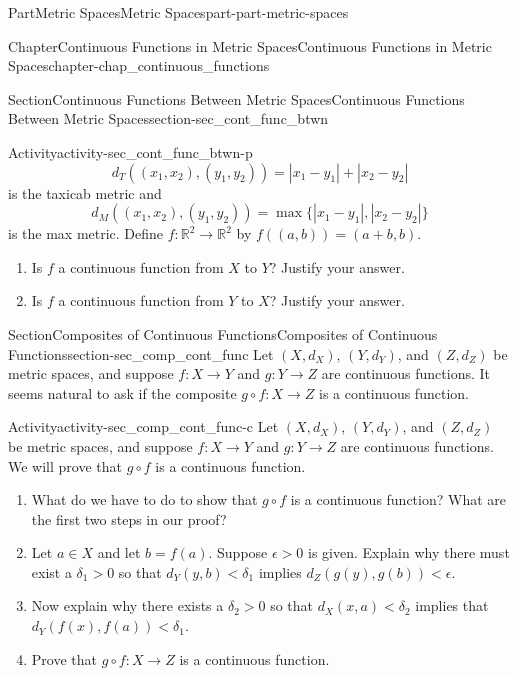 \documentclass[oneside,10pt,]{book}
\numberwithin{equation}{chapter}
\newcommand{\R}{\mathbb{R}}
\newcommand{\lt}{<}
\newcommand{\gt}{>}
\begin{document}
\begin{partptx}{Part}{Metric Spaces}{}{Metric Spaces}{}{}{part-part-metric-spaces}
\begin{chapterptx}{Chapter}{Continuous Functions in Metric Spaces}{}{Continuous Functions in Metric Spaces}{}{}{chapter-chap_continuous_functions}
\begin{sectionptx}{Section}{Continuous Functions Between Metric Spaces}{}{Continuous Functions Between Metric Spaces}{}{}{section-sec_cont_func_btwn}
\begin{activity}{Activity}{}{activity-sec_cont_func_btwn-p}
\begin{equation*}
d_T((x_1, x_2), (y_1,y_2)) = | x_1-y_1 | + | x_2-y_2 |
\end{equation*}
is the taxicab metric and%
\begin{equation*}
d_M((x_1, x_2), (y_1,y_2)) = \max\{| x_1-y_1 |,  | x_2-y_2 |\}
\end{equation*}
is the max metric. Define \(f : \R^2 \to \R^2\) by \(f((a,b)) = (a+b, b)\).%
\begin{enumerate}[font=\bfseries,label=(\alph*),ref=\alph*]%
\item{}Is \(f\) a continuous function from \(X\) to \(Y\)? Justify your answer.%
\item{}Is \(f\) a continuous function from \(Y\) to \(X\)? Justify your answer.%
\end{enumerate}%
\end{activity}%
\end{sectionptx}
%
%
\typeout{************************************************}
\typeout{************************************************}
%
\begin{sectionptx}{Section}{Composites of Continuous Functions}{}{Composites of Continuous Functions}{}{}{section-sec_comp_cont_func}
Let \((X, d_X)\), \((Y,d_Y)\), and \((Z, d_Z)\) be metric spaces, and suppose \(f: X \to Y\) and \(g: Y \to Z\) are continuous functions. It seems natural to ask if the composite \(g \circ f : X \to Z\) is a continuous function.%
\begin{activity}{Activity}{}{activity-sec_comp_cont_func-c}%
Let \((X, d_X)\), \((Y,d_Y)\), and \((Z, d_Z)\) be metric spaces, and suppose \(f: X \to Y\) and \(g: Y \to Z\) are continuous functions. We will prove that \(g \circ f\) is a continuous function.%
\begin{enumerate}[font=\bfseries,label=(\alph*),ref=\alph*]%
\item{}What do we have to do to show that \(g \circ f\) is a continuous function? What are the first two steps in our proof?%
\item{}Let \(a \in X\) and let \(b = f(a)\). Suppose \(\epsilon \gt 0\) is given. Explain why there must exist a \(\delta_1 \gt 0\) so that \(d_Y(y,b) \lt \delta_1\) implies \(d_Z(g(y), g(b)) \lt \epsilon\).%
\item{}Now explain why there exists a \(\delta_2 \gt 0\) so that \(d_X(x,a) \lt \delta_2\) implies that \(d_Y(f(x),
f(a)) \lt \delta_1\).%
\item{}Prove that \(g \circ f : X \to Z\) is a continuous function.%

\end{enumerate}
\end{activity}
\end{sectionptx}
\end{chapterptx}
\end{partptx}
\end{document}
